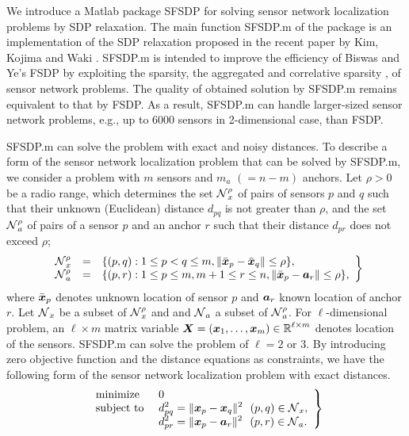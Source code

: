 \documentclass[12pt]{article}
\def\a{\mbox{\boldmath $a$}}
\def\x{\mbox{\boldmath $x$}}
\def\X{\mbox{\boldmath $X$}}
\def\NC{\mbox{$\cal N$}}
\def\Real{\mbox{$\mathbb{R}$}}
\begin{document}
We introduce a Matlab package SFSDP  for 
solving sensor network localization problems by 
SDP relaxation.
The main function SFSDP.m of the package is an implementation of the SDP relaxation 
proposed in the recent paper by Kim, Kojima and Waki \cite{KIM08}.  
SFSDP.m is intended to improve the efficiency of Biswas and Ye's FSDP \cite{BISWAS04}
by exploiting the sparsity, the aggregated and correlative sparsity 
\cite{FUKUDA00,NAKATA03,KOBAYASHI07a},  of sensor network problems. 
The quality of obtained solution by SFSDP.m remains equivalent to that by FSDP.
As a result,  SFSDP.m can handle larger-sized  sensor network problems, e.g.,
up to 6000 sensors in 2-dimensional case, than FSDP. 

SFSDP.m can solve the problem with exact  and noisy distances.
To describe a form of the sensor network localization problem that can be  solved by
SFSDP.m,  we consider  a problem with $m$ sensors and $m_a$ $(=n-m)$ anchors. 
Let $\rho > 0$ be a radio range,  which determines the set $\NC^{\rho}_x$ of pairs of 
sensors $p$ and $q$ such that their unknown (Euclidean) distance $d_{pq}$ is not greater than $\rho$, 
and the set $\NC^{\rho}_a$ of pairs of a sensor $p$ and an anchor $r$ 
such that their distance $d_{pr}$ does not exceed $\rho$;  
\begin{eqnarray}
\left. 
\begin{array}{lcl} 
\NC^{\rho}_x & = & \{ (p,q) : 1 \leq p < q \leq m, \| \bar{\x}_p - \bar{\x}_q \| \leq \rho \}, \\ 
\NC^{\rho}_a & = & \{ (p,r) : 1 \leq p \leq m,  m+1 \leq r \leq n, \| \bar{\x}_p - \a_r \| \leq \rho \},
\end{array}
\right\} 
\label{radiorange}
\end{eqnarray}
where $\bar{\x}_p$ denotes unknown location of sensor $p$ and $\a_r$ known location of 
anchor $r$. Let $\NC_x$ be a subset of $\NC^{\rho}_x$ and 
and $\NC_a$ a subset of $\NC^{\rho}_a$. 
 For $\ell$-dimensional problem,  an $\ell \times m$ matrix variable 
$\X = (\x_1,\ldots,\x_m) \in \Real^{\ell \times m}$  denotes location of the sensors. 
SFSDP.m can solve the problem of $\ell = 2 $ or $3$.
By introducing zero objective function and
 the distance equations  as constraints, we have the following form of the sensor network
 localization problem with exact distances.  
\begin{equation}
\left.
\begin{array}{lll}
\mbox{minimize }  & 0 \\
\mbox{subject to } &
\displaystyle  d_{pq}^2   
= \|\x_p - \x_q\| ^2 \ \  (p,q) \in \NC_x, \\
& \displaystyle  d_{pr}^2  
=  \|\x_p - \a_r\| ^2 \ \  (p,r) \in \NC_a. 
\end{array}
 \right\}
 \label{POPnoNoise}
\end{equation}
\end{document}

